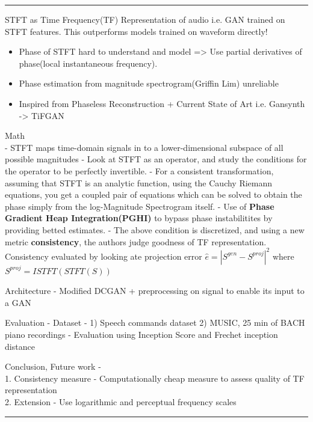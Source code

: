 \documentclass[11pt]{article}
\providecommand{\tightlist}{%
      \setlength{\itemsep}{0pt}\setlength{\parskip}{0pt}}
\begin{document}
\begin{center}\rule{0.5\linewidth}{\linethickness}\end{center}

    STFT as Time Frequency(TF) Representation of audio i.e. GAN trained on
STFT features. This outperforms models trained on waveform directly!

    \begin{itemize}
\tightlist
\item
  Phase of STFT hard to understand and model =\textgreater{} Use partial
  derivatives of phase(local instantaneous frequency).
\item
  Phase estimation from magnitude spectrogram(Griffin Lim) unreliable
\item
  Inspired from Phaseless Reconstruction + Current State of Art i.e.
  Gansynth -\textgreater{} TiFGAN
\end{itemize}

    Math\\
- STFT maps time-domain signals in to a lower-dimensional subspace of
all possible magnitudes - Look at STFT as an operator, and study the
conditions for the operator to be perfectly invertible. - For a
consistent transformation, assuming that STFT is an analytic function,
using the Cauchy Riemann equations, you get a coupled pair of equations
which can be solved to obtain the phase simply from the log-Magnitude
Spectrogram itself. - Use of \textbf{Phase Gradient Heap
Integration(PGHI)} to bypass phase instabilitites by providing betted
estimates. - The above condition is discretized, and using a new metric
\textbf{consistency}, the authors judge goodness of TF representation.
Consistency evaluated by looking ate projection error
\(\hat{e} = |S^{gen} - S^{proj}|^{2}\) where
\(S^{proj} = ISTFT(STFT(S))\)

    Architecture - Modified DCGAN + preprocessing on signal to enable its
input to a GAN

Evaluation - Dataset - 1) Speech commands dataset 2) MUSIC, 25 min of
BACH piano recordings - Evaluation using Inception Score and Frechet
inception distance

    Conclusion, Future work -\\
1. Consistency measure - Computationally cheap measure to assess quality
of TF representation\\
2. Extension - Use logarithmic and perceptual frequency scales

    \begin{center}\rule{0.5\linewidth}{\linethickness}\end{center}
\end{document}

